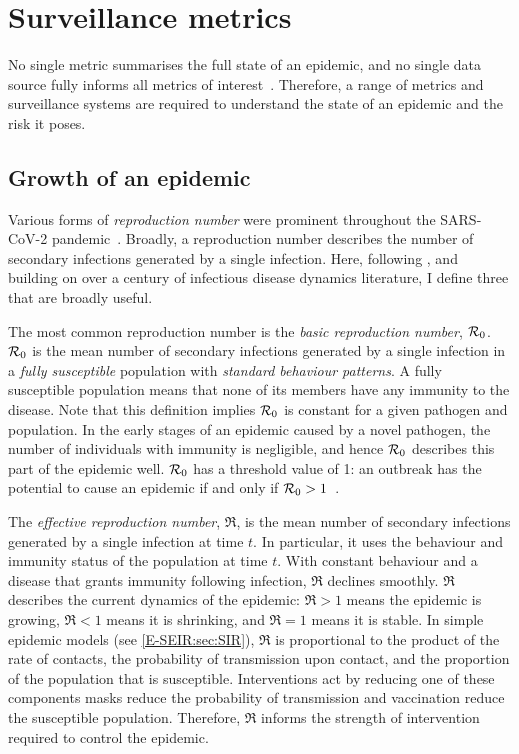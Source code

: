 \documentclass[thesis.tex]{subfiles}
\begin{document}
\section{Surveillance metrics} \label{intro:sec:metrics}

No single metric summarises the full state of an epidemic, and no single data source fully informs all metrics of interest~\autocite{royalSocietyRnumber,pellisEstimation,paragGrowthRates}.
Therefore, a range of metrics and surveillance systems are required to understand the state of an epidemic and the risk it poses.

\subsection{Growth of an epidemic}

Various forms of \emph{reproduction number} were prominent throughout the SARS-CoV-2 pandemic~\autocite{pellisEstimation}.
Broadly, a reproduction number describes the number of secondary infections generated by a single infection.
Here, following \textcite{pellisEstimation}, and building on over a century of infectious disease dynamics literature, I define three that are broadly useful.

The most common reproduction number is the \emph{basic reproduction number}, $\mathcal{R}_{0}$.
$\mathcal{R}_{0}$ is the mean number of secondary infections generated by a single infection in a \emph{fully susceptible} population with \emph{standard behaviour patterns}.
A fully susceptible population means that none of its members have any immunity to the disease.
Note that this definition implies $\mathcal{R}_{0}$ is constant for a given pathogen and population.
In the early stages of an epidemic caused by a novel pathogen, the number of individuals with immunity is negligible, and hence $\mathcal{R}_{0}$ describes this part of the epidemic well.
$\mathcal{R}_{0}$ has a threshold value of 1: an outbreak has the potential to cause an epidemic if and only if $\mathcal{R}_{0} > 1$~\autocite[76]{diekmannMathematical}.

The \emph{effective reproduction number}, $\Re$, is the mean number of secondary infections generated by a single infection at time $t$.
In particular, it uses the behaviour and immunity status of the population at time $t$.
With constant behaviour and a disease that grants immunity following infection, $\Re$ declines smoothly.
$\Re$ describes the current dynamics of the epidemic: $\Re > 1$ means the epidemic is growing, $\Re < 1$ means it is shrinking, and $\Re = 1$ means it is stable.
In simple epidemic models (see \cref{E-SEIR:sec:SIR}), $\Re$ is proportional to the product of the rate of contacts, the probability of transmission upon contact, and the proportion of the population that is susceptible.
Interventions act by reducing one of these components \eg masks reduce the probability of transmission and vaccination reduce the susceptible population.
Therefore, $\Re$ informs the strength of intervention required to control the epidemic.
\end{document}
